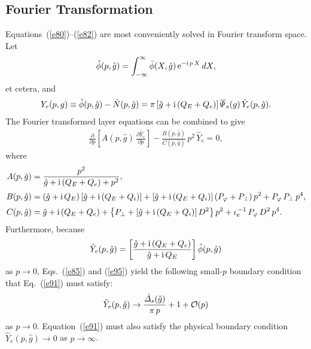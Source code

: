 \documentclass[12pt,prb,aps]{revtex4-1}
\begin{document}
\subsection{Fourier Transformation}
Equations~(\ref{e80})--(\ref{e82}) are most conveniently solved in Fourier transform space.\cite{err2} 
Let
\begin{equation}\label{e86a}
\hat{\phi}(p,\hat{g}) = \int_{-\infty}^\infty \bar{\phi}(X,\hat{g})\,{\rm e}^{-{\rm i}\,p\,X}\,dX,
\end{equation}
et cetera,
and
\begin{align}\label{e95}
Y_e(p,g)\equiv \hat{\phi}(p,\hat{g})-\hat{N}(p,\hat{g})= \pi\,[\hat{g}+{ \rm i}\,(Q_E+Q_e)]\,\overline{\mit\Psi}_s(g)\,\hat{Y}_e(p,\hat{g}).
\end{align}
The Fourier transformed layer equations can be combined to give 
\begin{align}\label{e91}
\frac{\partial}{\partial p}\!\left[A(p,\hat{g})\,\frac{\partial \hat{Y}_e}{\partial p}\right] - \frac{B(p,\hat{g})}{C(p,\hat{g})}\,p^2\,\hat{Y}_e=0,
\end{align}
where
\begin{align}
A(p,\hat{g}) &= \frac{p^2}{\hat{g}+{\rm i}\,(Q_E+Q_e)+p^2},\label{e97a}\\[0.5ex]
B(p,\hat{g})&= (\hat{g}+{\rm i}\,Q_E)\,[\hat{g}+{\rm i}\,(Q_E+Q_i)] + [\hat{g}+{\rm i}\,(Q_E+Q_i)]\,(P_\varphi+P_\perp)\,p^2 + P_\varphi\,P_\perp\,p^4,\\[0.5ex]
C(p,\hat{g}) &= \hat{g}+{\rm i}\,(Q_E+Q_e)+ \left\{P_\perp
+[\hat{g}+{\rm i}\,(Q_E+Q_i)]\,D^2\right\}p^2 + \iota_e^{\,-1}\,P_\varphi\,D^2\,p^4.\label{e97c}
\end{align}
Furthermore, because
\begin{equation}
\hat{Y}_e(p,\hat{g}) = \left[\frac{\hat{g}+{\rm i}\,(Q_E+Q_e)}{\hat{g}+{\rm i}\,Q_E}\right]\hat{\phi}(p,\hat{g})
\end{equation}
as $p\rightarrow 0$, Eqs.~(\ref{e85}) and (\ref{e95})
yield the following small-$p$ boundary condition that Eq.~(\ref{e91}) must satisfy:\,\cite{ed}
\begin{equation}\label{e101}
\hat{Y}_e(p,\hat{g})\rightarrow\frac{\hat{\mit\Delta}_s(\hat{g})}{\pi\,p} + 1+ {\cal O}(p)
\end{equation}
as $p\rightarrow 0$.  Equation~(\ref{e91}) must also satisfy the  physical boundary condition 
$\hat{Y}_e(p,\hat{g})\rightarrow 0$ 
as $p\rightarrow\infty$. 
\end{document}
